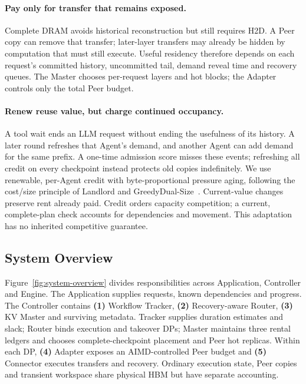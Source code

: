 \paragraph{Pay only for transfer that remains exposed.}
Complete DRAM avoids historical reconstruction but still requires H2D.
A Peer copy can remove that transfer; later-layer transfers may already
be hidden by computation that must still execute. Useful residency
therefore depends on each request's committed history, uncommitted tail,
demand reveal time and recovery queues. The Master chooses per-request
layers and hot blocks; the Adapter controls only the total Peer budget.

\paragraph{Renew reuse value, but charge continued occupancy.}
A tool wait ends an LLM request without ending the usefulness of its
history. A later round refreshes that Agent's demand, and another Agent
can add demand for the same prefix. A one-time admission score misses
these events; refreshing all credit on every checkpoint instead protects
old copies indefinitely. We use renewable, per-Agent credit with
byte-proportional pressure aging, following the cost/size principle of
Landlord and GreedyDual-Size~\cite{young2002landlord,cao1997greedydual}.
Current-value changes preserve rent already paid. Credit orders capacity
competition; a current, complete-plan check accounts for dependencies and
movement. This adaptation has no inherited competitive guarantee.

\subsection{System Overview}
\label{sec:system-overview}

Figure~\ref{fig:system-overview} divides responsibilities across
Application, Controller and Engine. The Application supplies requests,
known dependencies and progress. The Controller contains
\textbf{(1)} Workflow Tracker, \textbf{(2)} Recovery-aware Router,
\textbf{(3)} KV Master and surviving metadata. Tracker supplies duration
estimates and slack; Router binds execution and takeover DPs; Master
maintains three rental ledgers and chooses complete-checkpoint placement
and Peer hot replicas. Within each
DP, \textbf{(4)} Adapter exposes an AIMD-controlled Peer budget and \textbf{(5)} Connector
executes transfers and recovery. Ordinary execution state, Peer copies
and transient workspace share physical HBM but have separate accounting.


